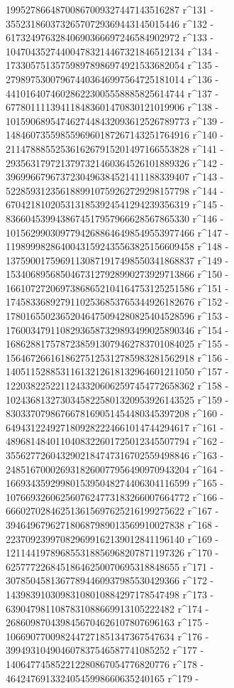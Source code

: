        19952786648700867009327447143516287 r^131 - 
       35523186037326570729369443145015446 r^132 - 
       61732497632840690366697246584902972 r^133 - 
       104704352744004783214467321846512134 r^134 - 
       173305751357598978986974921533682054 r^135 - 
       279897530079674403646997564725181014 r^136 - 
       441016407460286223005558885825614744 r^137 - 
       677801111394118483601470830121019906 r^138 - 
       1015906895474627448432093612526789773 r^139 - 
       1484607355985596960187267143251764916 r^140 - 
       2114788855253616267915201497166553828 r^141 - 
       2935631797213797321460364526101889326 r^142 - 
       3969966796737230496384521411188339407 r^143 - 
       5228593123561889910759262729298157798 r^144 - 
       6704218102053131853924541294239356319 r^145 - 
       8366045399438674517957966628567865330 r^146 - 
       10156299030977942688646498549553977466 r^147 - 
       11989998286400431592435563825156609458 r^148 - 
       13759001759691130871917498550341868837 r^149 - 
       15340689568504673127928990273929713866 r^150 - 
       16610727206973868652104164753125251586 r^151 - 
       17458336892791102536853765344926182676 r^152 - 
       17801655023652046475094280825404528596 r^153 - 
       17600347911082936587329893499025890346 r^154 - 
       16862881757872385913079462783701084025 r^155 - 
       15646726616186275125312785983281562918 r^156 - 
       14051152885311613212618132964601211050 r^157 - 
       12203822522112433206062597454772658362 r^158 - 
       10243681327303458225801320953926143525 r^159 - 
       8303370798676678169051454480345397208 r^160 - 
       6494312249271809282224661014744294617 r^161 - 
       4896814840110408322601725012345507794 r^162 - 
       3556277260432902184747316702559498846 r^163 - 
       2485167000269318260077956490970943204 r^164 - 
       1669343592998015395048274406304116599 r^165 - 
       1076693260625607624773183266007664772 r^166 - 
       666027028462513615697625216199275622 r^167 - 
       394649679627180687989013569910027838 r^168 - 
       223709239970829699162139012841196140 r^169 - 
       121144197896855318856968207871197326 r^170 - 
       62577722684518646250070695318848655 r^171 - 
       30785045813677894460937985530429366 r^172 - 
       14398391030983108010884297178547498 r^173 - 
       6390479811087831088669913105222482 r^174 - 
       2686098704398456704626107807696163 r^175 - 
       1066907700982447271851347367547634 r^176 - 
       399493104904607837546587741085252 r^177 - 
       140647745852212280867054776820776 r^178 - 
       46424769133240545998660635240165 r^179 - 
